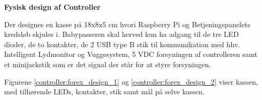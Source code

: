 
\textbf{Fysisk design af Controller}

Der designes en kasse på 18x8x5 cm hvori Raspberry Pi og Betjeningspanelets kredsløb skjules i. Babypasseren skal herved kun ha adgang til de tre LED dioder, de to kontakter, de 2 USB type B stik til kommunikation med hhv. Intelligent Lydmonitor og Vuggesystem, 5 VDC forsyningen af controlleren samt et minijackstik som er det signal der står for at styre forsyningen. 

Figurene \ref{controller:forex_design_1} og \ref{controller:forex_design_2} viser kassen, med tilhørende LEDs, kontakter, stik samt mål på selve kassen.



